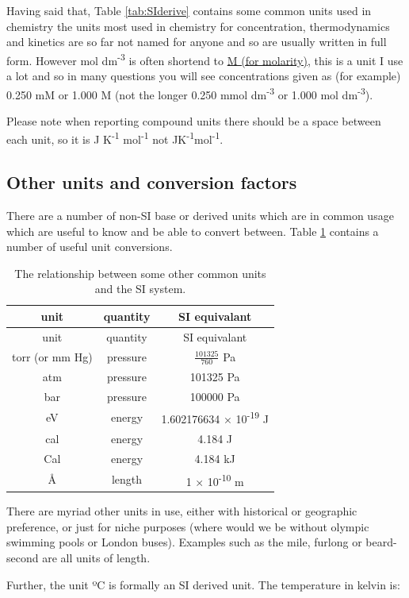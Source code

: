 \documentclass[
]{book}
\begin{document}
Having said that, Table \ref{tab:SIderive} contains some common units used in chemistry the units most used in chemistry for concentration, thermodynamics and kinetics are so far not named for anyone and so are usually written in full form. However mol dm\textsuperscript{-3} is often shortend to \href{https://goldbook.iupac.org/terms/view/A00295}{M (for molarity)}, this is a unit I use a lot and so in many questions you will see concentrations given as (for example) 0.250 mM or 1.000 M (not the longer 0.250 mmol dm\textsuperscript{-3} or 1.000 mol dm\textsuperscript{-3}).

Please note when reporting compound units there should be a space between each unit, so it is J K\textsuperscript{-1} mol\textsuperscript{-1} not JK\textsuperscript{-1}mol\textsuperscript{-1}.

\hypertarget{other-units-and-conversion-factors}{%
\subsection{Other units and conversion factors}\label{other-units-and-conversion-factors}}

There are a number of non-SI base or derived units which are in common usage which are useful to know and be able to convert between. Table \ref{tab:nonSI} contains a number of useful unit conversions.

\begin{longtable}[]{@{}ccc@{}}
\caption{\label{tab:nonSI} The relationship between some other common units and the SI system.}\tabularnewline
\toprule
unit & quantity & SI equivalant\tabularnewline
\midrule
\endfirsthead
\toprule
unit & quantity & SI equivalant\tabularnewline
\midrule
\endhead
torr (or mm Hg) & pressure & \(\frac{101325}{760}\) Pa\tabularnewline
atm & pressure & 101325 Pa\tabularnewline
bar & pressure & 100000 Pa\tabularnewline
eV & energy & 1.602176634 × 10\textsuperscript{-19} J\tabularnewline
cal & energy & 4.184 J\tabularnewline
Cal & energy & 4.184 kJ\tabularnewline
Å & length & 1 × 10\textsuperscript{-10} m\tabularnewline
\bottomrule
\end{longtable}

There are myriad other units in use, either with historical or geographic preference, or just for niche purposes (where would we be without olympic swimming pools or London buses). Examples such as the mile, furlong or beard-second are all units of length.

Further, the unit ºC is formally an SI derived unit. The temperature in kelvin is:
\end{document}
